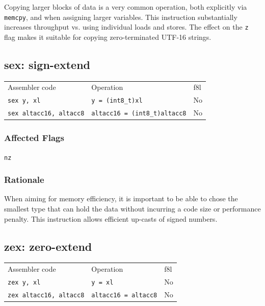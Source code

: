\documentclass{book}
\begin{document}
Copying larger blocks of data is a very common operation, both explicitly via \texttt{memcpy}, and when assigning larger variables. This instruction substantially increases throughput vs. using individual loads and stores. The effect on the \texttt{z} flag makes it suitable for copying zero-terminated UTF-16 strings.


\subsection{sex: sign-extend}

\begin{tabular}{l l l}
Assembler code                 & Operation                            & f8l \\
\texttt{sex y, xl}             & \texttt{y = (int8\_t)xl}             & No \\
\texttt{sex altacc16, altacc8} & \texttt{altacc16 = (int8\_t)altacc8} & No \\
\end{tabular}

\subsubsection*{Affected Flags}

\texttt{nz}

\subsubsection*{Rationale}

When aiming for memory efficiency, it is important to be able to chose the smallest type that can hold the data without incurring a code size or performance penalty. This instruction allows efficient up-casts of signed numbers.


\subsection{zex: zero-extend}

\begin{tabular}{l l l}
Assembler code                 & Operation                   & f8l \\
\texttt{zex y, xl}             & \texttt{y = xl}             & No \\
\texttt{zex altacc16, altacc8} & \texttt{altacc16 = altacc8} & No \\
\end{tabular}
\end{document}
